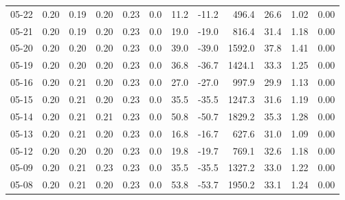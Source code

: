 \begin{threeparttable}
{\begin{tabular}{lrrrrrrrrrrr}
  05-22 &          0.20 &          0.19 &          0.20 &        0.23 &                 0.0 &                11.2 &      -11.2 &               496.4 &             26.6 &            1.02 &                   0.00 \\
  05-21 &          0.20 &          0.19 &          0.20 &        0.23 &                 0.0 &                19.0 &      -19.0 &               816.4 &             31.4 &            1.18 &                   0.00 \\
  05-20 &          0.20 &          0.20 &          0.20 &        0.23 &                 0.0 &                39.0 &      -39.0 &              1592.0 &             37.8 &            1.41 &                   0.00 \\
  05-19 &          0.20 &          0.20 &          0.20 &        0.23 &                 0.0 &                36.8 &      -36.7 &              1424.1 &             33.3 &            1.25 &                   0.00 \\
  05-16 &          0.20 &          0.21 &          0.20 &        0.23 &                 0.0 &                27.0 &      -27.0 &               997.9 &             29.9 &            1.13 &                   0.00 \\
  05-15 &          0.20 &          0.21 &          0.20 &        0.23 &                 0.0 &                35.5 &      -35.5 &              1247.3 &             31.6 &            1.19 &                   0.00 \\
  05-14 &          0.20 &          0.21 &          0.21 &        0.23 &                 0.0 &                50.8 &      -50.7 &              1829.2 &             35.3 &            1.28 &                   0.00 \\
  05-13 &          0.20 &          0.21 &          0.20 &        0.23 &                 0.0 &                16.8 &      -16.7 &               627.6 &             31.0 &            1.09 &                   0.00 \\
  05-12 &          0.20 &          0.20 &          0.20 &        0.23 &                 0.0 &                19.8 &      -19.7 &               769.1 &             32.6 &            1.18 &                   0.00 \\
  05-09 &          0.20 &          0.21 &          0.23 &        0.23 &                 0.0 &                35.5 &      -35.5 &              1327.2 &             33.0 &            1.22 &                   0.00 \\
  05-08 &          0.20 &          0.21 &          0.20 &        0.23 &                 0.0 &                53.8 &      -53.7 &              1950.2 &             33.1 &            1.24 &                   0.00 \\

\end{tabular}}
\end{threeparttable}
